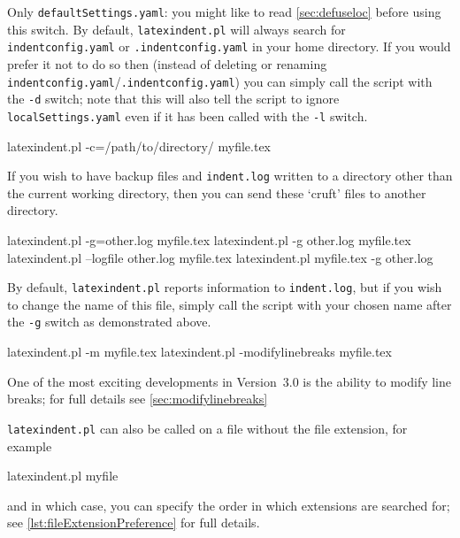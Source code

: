 	Only \texttt{defaultSettings.yaml}: you might like to read \cref{sec:defuseloc} before
	using this switch. By default, \texttt{latexindent.pl} will always search for
	\texttt{indentconfig.yaml} or \texttt{.indentconfig.yaml}  in your home directory. If you would prefer it not to do so
	then (instead of deleting or renaming \texttt{indentconfig.yaml}/\texttt{.indentconfig.yaml}) you can simply
	call the script with the \texttt{-d} switch; note that this will also tell
	the script to ignore \texttt{localSettings.yaml} even if it has been called with the
	\texttt{-l} switch.

	\begin{commandshell}
latexindent.pl -c=/path/to/directory/ myfile.tex
      \end{commandshell}

	If you wish to have backup files and \texttt{indent.log} written to a directory
	other than the current working directory, then you can send these `cruft' files
	to another directory.

	\begin{commandshell}
latexindent.pl -g=other.log myfile.tex
latexindent.pl -g other.log myfile.tex
latexindent.pl --logfile other.log myfile.tex
latexindent.pl myfile.tex -g other.log 
      \end{commandshell}

	By default, \texttt{latexindent.pl} reports information to \texttt{indent.log}, but if you wish to change the
	name of this file, simply call the script with your chosen name after the \texttt{-g} switch as demonstrated above.

	\begin{commandshell}
latexindent.pl -m myfile.tex
latexindent.pl -modifylinebreaks myfile.tex
      \end{commandshell}

	One of the most exciting developments in Version~3.0 is the ability to modify line breaks; for full details
	see \vref{sec:modifylinebreaks}

	\texttt{latexindent.pl} can also be called on a file without the file extension, for
	example
	\begin{commandshell}
latexindent.pl myfile
    \end{commandshell}
	and in which case, you can specify
	the order in which extensions are searched for; see \vref{lst:fileExtensionPreference}
	for full details.

